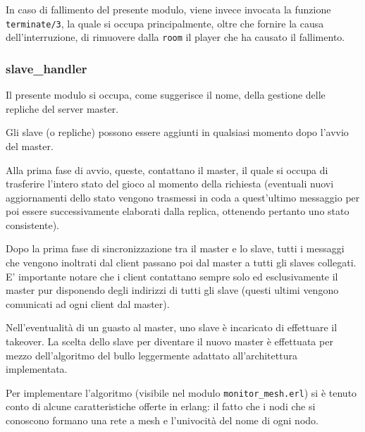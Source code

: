\documentclass[paper=a4, fontsize=11pt]{scrartcl} %
\numberwithin{equation}{section} %
\numberwithin{figure}{section} %
\numberwithin{table}{section} %
\begin{document}
In caso di fallimento del presente modulo, viene invece invocata la funzione \texttt{terminate/3}, la quale si occupa principalmente, oltre che fornire la causa dell'interruzione, di rimuovere dalla \texttt{room} il player che ha causato il fallimento.
\subsubsection{slave\_handler}
Il presente modulo si occupa, come suggerisce il nome, della gestione delle repliche del server master.

Gli slave (o repliche) possono essere aggiunti in qualsiasi momento dopo l'avvio del master.

Alla prima fase di avvio, queste, contattano il master, il quale si occupa di trasferire l'intero stato del gioco al momento della richiesta (eventuali nuovi aggiornamenti dello stato vengono trasmessi in coda a quest'ultimo messaggio per poi essere successivamente elaborati dalla replica, ottenendo pertanto uno stato consistente).

Dopo la prima fase di sincronizzazione tra il master e lo slave, tutti i messaggi che vengono inoltrati dal client passano poi dal master a tutti gli slaves collegati. E' importante notare che i client contattano sempre solo ed esclusivamente il master pur disponendo degli indirizzi di tutti gli slave (questi ultimi vengono comunicati ad ogni client dal master).

Nell'eventualità di un guasto al master, uno slave è incaricato di effettuare il takeover. La scelta dello slave per diventare il nuovo master è effettuata per mezzo dell'algoritmo del bullo leggermente adattato all'architettura implementata.

Per implementare l'algoritmo (visibile nel modulo \texttt{monitor\_mesh.erl}) si è tenuto conto di alcune caratteristiche offerte in erlang: il fatto che i nodi che si conoscono formano una rete a mesh e l'univocità del nome di ogni nodo.
\end{document}
